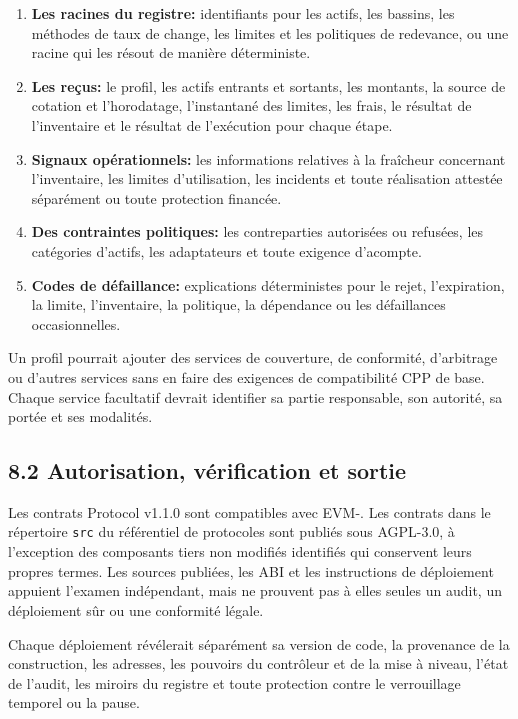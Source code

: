 \documentclass[11pt]{article}
\begin{document}
\begin{enumerate}[leftmargin=*]
\item \textbf{Les racines du registre:} identifiants pour les actifs, les bassins, les méthodes de taux de change, les limites et les politiques de redevance, ou une racine qui les résout de manière déterministe.
\item \textbf{Les reçus:} le profil, les actifs entrants et sortants, les montants, la source de cotation et l'horodatage, l'instantané des limites, les frais, le résultat de l'inventaire et le résultat de l'exécution pour chaque étape.
\item \textbf{Signaux opérationnels:} les informations relatives à la fraîcheur concernant l'inventaire, les limites d'utilisation, les incidents et toute réalisation attestée séparément ou toute protection financée.
\item \textbf{Des contraintes politiques:} les contreparties autorisées ou refusées, les catégories d'actifs, les adaptateurs et toute exigence d'acompte.
\item \textbf{Codes de défaillance:} explications déterministes pour le rejet, l'expiration, la limite, l'inventaire, la politique, la dépendance ou les défaillances occasionnelles.
\end{enumerate}
Un profil pourrait ajouter des services de couverture, de conformité, d'arbitrage ou d'autres services sans en faire des exigences de compatibilité CPP de base. Chaque service facultatif devrait identifier sa partie responsable, son autorité, sa portée et ses modalités.

\subsection*{8.2 Autorisation, vérification et sortie}

Les contrats Protocol v1.1.0 sont compatibles avec EVM-. Les contrats dans le répertoire \texttt{src} du référentiel de protocoles sont publiés sous AGPL-3.0, à l'exception des composants tiers non modifiés identifiés qui conservent leurs propres termes. Les sources publiées, les ABI et les instructions de déploiement appuient l'examen indépendant, mais ne prouvent pas à elles seules un audit, un déploiement sûr ou une conformité légale.

Chaque déploiement révélerait séparément sa version de code, la provenance de la construction, les adresses, les pouvoirs du contrôleur et de la mise à niveau, l'état de l'audit, les miroirs du registre et toute protection contre le verrouillage temporel ou la pause.
\end{document}
